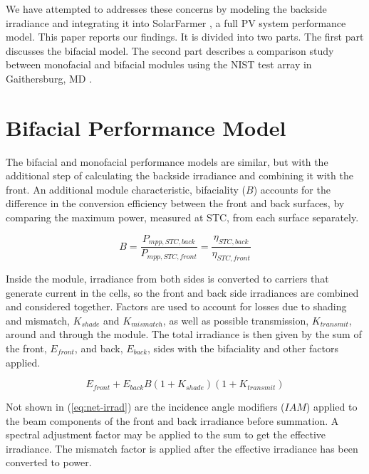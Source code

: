 \documentclass[conference]{IEEEtran}
\begin{document}
We have attempted to addresses these concerns by modeling the backside irradiance and integrating it into SolarFarmer \cite{Mikofski_8547323}, a full PV system performance model.  This paper reports our findings.  It is divided into two parts.  The first part discusses the bifacial model.  The second part describes a comparison study between monofacial and bifacial modules using the NIST test array in Gaithersburg, MD \cite{Boyd2017,Boyd2017a,Boyd2017b}.\\


\section{Bifacial Performance Model}
The bifacial and monofacial performance models are similar, but with the additional step of calculating the backside irradiance and combining it with the front.  An additional module characteristic, bifaciality ($B$) accounts for the difference in the conversion efficiency between the front and back surfaces, by comparing the maximum power, measured at STC, from each surface separately.

\begin{equation}
B=\frac{P_{mpp,STC,back}}{P_{mpp,STC,front}}=\frac{\eta_{STC,back}}{\eta_{STC,front}}
\label{eq:bifaciality}
\end{equation}

Inside the module, irradiance from both sides is converted to carriers that generate current in the cells, so the front and back side irradiances are combined and considered together.  Factors are used to account for losses due to shading and mismatch, $K_{shade}$ and $K_{mismatch}$, as well as possible transmission, $K_{transmit}$, around and through the module.  The total irradiance is then given by the sum of the front, $E_{front}$, and back, $E_{back}$, sides with the bifaciality and other factors applied.

\begin{equation}
E_{front} + E_{back} B \left(1 + K_{shade}\right)\left(1 + K_{transmit}\right)
\label{eq:net-irrad}
\end{equation}

Not shown in (\ref{eq:net-irrad}) are the incidence angle modifiers ($IAM$) applied to the beam components of the front and back irradiance before summation. A spectral adjustment factor may be applied to the sum to get the effective irradiance.  The mismatch factor is applied after the effective irradiance has been converted to power.
\end{document}
